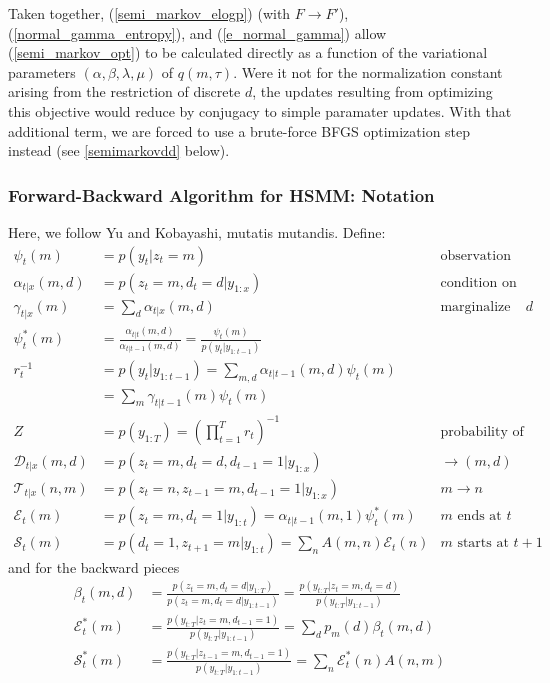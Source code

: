 \documentclass[10pt,letterpaper]{article}
\begin{document}
Taken together, (\ref{semi_markov_elogp}) (with $F\rightarrow F'$), (\ref{normal_gamma_entropy}), and (\ref{e_normal_gamma}) allow (\ref{semi_markov_opt}) to be calculated directly as a function of the variational parameters $(\alpha, \beta, \lambda, \mu)$ of $q(m, \tau)$. Were it not for the normalization constant arising from the restriction of discrete $d$, the updates resulting from optimizing this objective would reduce by conjugacy to simple paramater updates. With that additional term, we are forced to use a brute-force BFGS optimization step instead (see \ref{semimarkovdd} below).


\subsubsection{Forward-Backward Algorithm for HSMM: Notation}
Here, we follow Yu and Kobayashi, mutatis mutandis. Define:
\begin{align*}
    \psi_t(m) &= p(y_t|z_t=m) &\text{observation probability}\\
    \alpha_{t|x}(m, d) &= p(z_t=m, d_t=d|y_{1:x}) &\text{condition on data}\\
    \gamma_{t|x}(m) &= \sum_d \alpha_{t|x} (m, d) &\text{marginalize out }d\\
    \psi^*_t(m) &= \frac{\alpha_{t|t}(m, d)}{\alpha_{t|t-1}(m, d)} =
    \frac{\psi_t(m)}{p(y_t|y_{1:t-1})} \\
    r_t^{-1} &= p(y_t|y_{1:t-1}) = \sum_{m,d} \alpha_{t|t-1}(m, d)\psi_t(m) \\
    &= \sum_m \gamma_{t|t-1}(m) \psi_t(m) \\
    Z &= p(y_{1:T}) = \left(\prod_{t=1}^T r_t\right)^{-1} &\text{probability of data} \\
    \mathcal{D}_{t|x}(m, d) &= p(z_t=m, d_t=d, d_{t-1}=1|y_{1:x}) &\rightarrow (m, d) \\
    \mathcal{T}_{t|x}(n, m) &= p(z_t=n, z_{t-1}=m, d_{t-1}=1|y_{1:x}) &m \rightarrow n \\
    \mathcal{E}_t(m) &= p(z_t=m, d_t=1|y_{1:t}) = \alpha_{t|t-1}(m, 1) \psi^*_t(m) &m \text{ ends at } t \\
    \mathcal{S}_t(m) &= p(d_t=1, z_{t+1}=m|y_{1:t}) = \sum_n A(m, n)\mathcal{E}_t(n) &m \text{ starts at } t+1
\end{align*}
and for the backward pieces
\begin{align*}
    \beta_t(m, d) &= \frac{p(z_t=m, d_t=d|y_{1:T})}{p(z_t=m, d_t=d|y_{1:t-1})}
    = \frac{p(y_{t:T}|z_t=m, d_t=d)}{p(y_{t:T}|y_{1:t-1})} \\
    \mathcal{E}^*_t(m) &= \frac{p(y_{t:T}|z_t=m, d_{t-1} = 1)}{p(y_{t:T}|y_{1:t-1})} = \sum_d p_m(d) \beta_t(m, d) \\
    \mathcal{S}^*_t(m) &= \frac{p(y_{t:T}|z_{t-1}=m, d_{t-1}=1)}{p(y_{t:T}|y_{1:t-1})} = \sum_n \mathcal{E}^*_t(n) A(n, m)
\end{align*}
\end{document}
